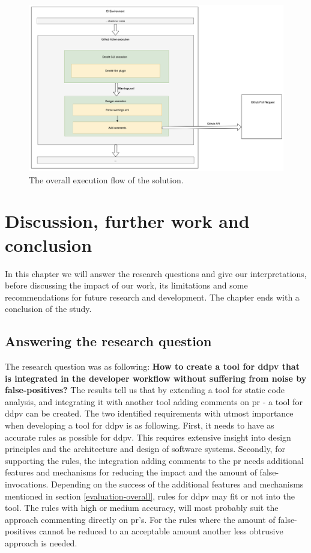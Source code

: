 \documentclass[pdftex,10pt,b5paper,twoside]{report}
\begin{document}
\begin{figure}
    \centering
    \includegraphics[width=\textwidth]{images/detekt-hint-execution.png}
    \caption{The overall execution flow of the solution.}
    \label{fig:integration}
\end{figure}

\cleardoublepage
\chapter{Discussion, further work and conclusion}
\label{discussion}
In this chapter we will answer the research questions and give our interpretations, before discussing the impact of our work, its limitations and some recommendations for future research and development. The chapter ends with a conclusion of the study.

\section{Answering the research question}

The research question was as following: \textbf{How to create a tool for \gls{ddpv} that is integrated in the developer workflow without suffering from noise by false-positives?}
The results tell us that by extending a tool for static code analysis, and integrating it with another tool adding comments on \gls{pr} - a tool for \gls{ddpv} can be created. The two identified requirements with utmost importance when developing a tool for \gls{ddpv} is as following. First, it needs to have as accurate rules as possible for \gls{ddpv}. This requires extensive insight into design principles and the architecture and design of software systems. Secondly, for supporting the rules, the integration adding comments to the \gls{pr} needs additional features and mechanisms for reducing the impact and the amount of false-invocations. Depending on the success of the additional features and mechanisms mentioned in section \ref{evaluation-overall}, rules for \gls{ddpv} may fit or not into the tool. The rules with high or medium accuracy, will most probably suit the approach commenting directly on \gls{pr}'s. For the rules where the amount of false-positives cannot be reduced to an acceptable amount another less obtrusive approach is needed. 
\end{document}
